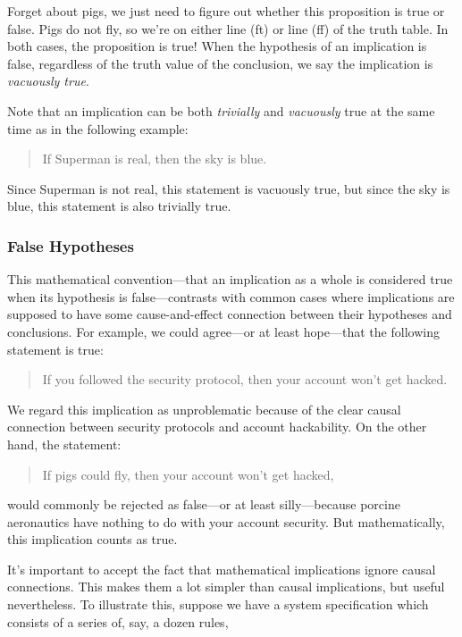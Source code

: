 \documentclass[11pt,oneside]{book}
\theoremstyle{definition}
\begin{document}
Forget about pigs, we just need to figure out whether this proposition is true or false.
Pigs do not fly, so we're on either line (ft) or line (ff) of the truth table.
In both cases, the proposition is true!
When the hypothesis of an implication is false, regardless of the truth value of the conclusion, we say the implication is \emph{vacuously true}.

Note that an implication can be both \emph{trivially} and \emph{vacuously} true at the same time as in the following example:

\begin{quote}
    If Superman is real, then the sky is blue.
\end{quote}

Since Superman is not real, this statement is vacuously true, but since the sky is blue, this statement is also trivially true.


\subsubsection{False Hypotheses}
This mathematical convention—that an implication as a whole is considered true when its hypothesis is false—contrasts with common cases where implications are supposed to have some cause-and-effect connection between their hypotheses and conclusions.
For example, we could agree—or at least hope—that the following statement is true:

\begin{quote}
    If you followed the security protocol, then your account won't get hacked.
\end{quote}

We regard this implication as unproblematic because of the clear causal connection between security protocols and account hackability.
On the other hand, the statement:
\begin{quote}
    If pigs could fly, then your account won't get hacked,
\end{quote}
would commonly be rejected as false—or at least silly—because porcine aeronautics have nothing to do with your account security.
But mathematically, this implication counts as true.

It's important to accept the fact that mathematical implications ignore causal connections.
This makes them a lot simpler than causal implications, but useful nevertheless.
To illustrate this, suppose we have a system specification which consists of a series of, say, a dozen rules,
\end{document}
